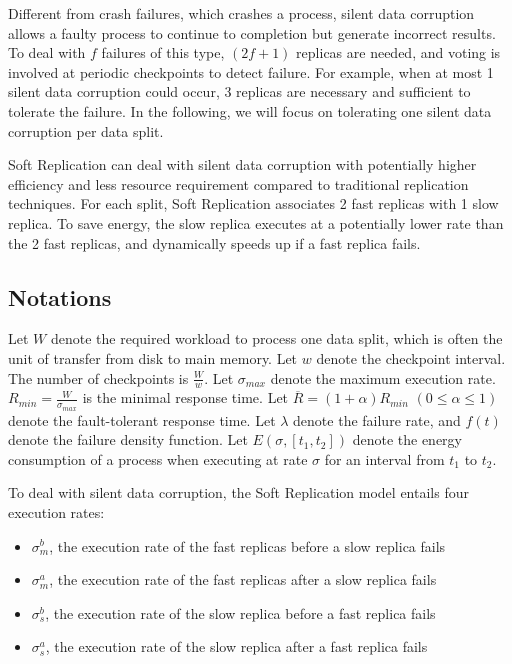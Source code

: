Different from crash failures, which crashes a process, silent data corruption allows a faulty process to continue to completion but generate incorrect results. To deal with $f$ failures of this type, $(2f+1)$ replicas are needed, and voting is involved at periodic checkpoints to detect failure. For example, when at most 1 silent data corruption could occur, 3 replicas are necessary and sufficient to tolerate the failure. In the following, we will focus on tolerating one silent data corruption per data split. 

Soft Replication can deal with silent data corruption with potentially higher efficiency and less resource requirement compared to traditional replication techniques. For each split, Soft Replication associates 2 fast replicas with 1 slow replica. To save energy, the slow replica executes at a potentially lower rate than the 2 fast replicas, and dynamically speeds up if a fast replica fails. 

\subsection{Notations}
Let $W$ denote the required workload to process one data split, which is often the unit of transfer from disk to main memory. Let $w$ denote the checkpoint interval. The number of checkpoints is $\frac{W}{w}$. Let $\sigma_{max}$ denote the maximum execution rate. $R_{min}=\frac{W}{\sigma_{max}}$ is the minimal response time. Let $\overline{R}=(1+\alpha)R_{min}$ $(0\leq \alpha \leq 1)$ denote the fault-tolerant response time. Let $\lambda$ denote the failure rate, and $f(t)$ denote the failure density function. Let $E(\sigma, [t_1, t_2])$ denote the energy consumption of a process when executing at rate $\sigma$ for an interval from $t_1$ to $t_2$.

To deal with silent data corruption, the Soft Replication model entails four execution rates:
\begin{itemize}
	\item $\sigma_{m}^b$, the execution rate of the fast replicas before a slow replica fails
    \item $\sigma_{m}^a$, the execution rate of the fast replicas after a slow replica fails
    \item $\sigma_{s}^b$, the execution rate of the slow replica before a fast replica fails
    \item $\sigma_{s}^a$, the execution rate of the slow replica after a fast replica fails
\end{itemize}

